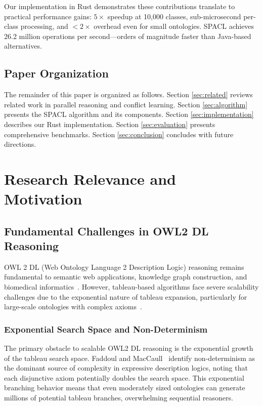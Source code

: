 \documentclass[preprint,12pt]{elsarticle}
\begin{document}
Our implementation in Rust demonstrates these contributions translate to practical performance gains: $5\times$ speedup at 10,000 classes, sub-microsecond per-class processing, and $<2\times$ overhead even for small ontologies. SPACL achieves 26.2 million operations per second---orders of magnitude faster than Java-based alternatives.

\subsection{Paper Organization}
\label{sec:organization}

The remainder of this paper is organized as follows. Section \ref{sec:related} reviews related work in parallel reasoning and conflict learning. Section \ref{sec:algorithm} presents the SPACL algorithm and its components. Section \ref{sec:implementation} describes our Rust implementation. Section \ref{sec:evaluation} presents comprehensive benchmarks. Section \ref{sec:conclusion} concludes with future directions.

\section{Research Relevance and Motivation}

\subsection{Fundamental Challenges in OWL2 DL Reasoning}

OWL 2 DL (Web Ontology Language 2 Description Logic) reasoning remains fundamental to semantic web applications, knowledge graph construction, and biomedical informatics~\cite{hitzler2012owl}. However, tableau-based algorithms face severe scalability challenges due to the exponential nature of tableau expansion, particularly for large-scale ontologies with complex axioms~\cite{amir2017cedar}.

\subsubsection{Exponential Search Space and Non-Determinism}

The primary obstacle to scalable OWL2 DL reasoning is the exponential growth of the tableau search space. Faddoul and MacCaull~\cite{faddoul2015fork} identify non-determinism as the dominant source of complexity in expressive description logics, noting that each disjunctive axiom potentially doubles the search space. This exponential branching behavior means that even moderately sized ontologies can generate millions of potential tableau branches, overwhelming sequential reasoners.
\end{document}
